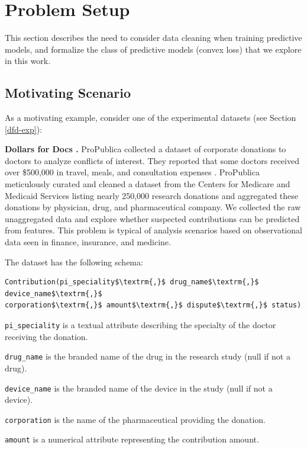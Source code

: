 \section{Problem Setup}\label{background}
This section describes the need to consider data cleaning when training predictive models, and formalize the class of predictive models (convex loss) that we explore in this work.

\subsection{Motivating Scenario}
As a motivating example, consider one of the experimental datasets (see Section \ref{dfd-exp}):

\vspace{0.25em}

\noindent\textbf{Dollars for Docs \cite{dollarsfordocs}. }
ProPublica collected a dataset of corporate donations to doctors to analyze conflicts of interest. 
They reported that some doctors received over \$500,000 in travel, meals, and consultation expenses \cite{dollarsfordocsa}.
ProPublica meticulously curated and cleaned a dataset from the Centers for Medicare and Medicaid Services listing nearly 250,000 research donations and aggregated these donations by physician, drug, and pharmaceutical company.
We collected the raw unaggregated data and explore whether suspected contributions can be predicted from features.
This problem is typical of analysis scenarios based on observational data seen in finance, insurance, and medicine.

The dataset has the following schema:
\begin{lstlisting}[mathescape,basicstyle={\scriptsize}]
Contribution(pi_speciality$\textrm{,}$ drug_name$\textrm{,}$ device_name$\textrm{,}$
corporation$\textrm{,}$ amount$\textrm{,}$ dispute$\textrm{,}$ status)
\end{lstlisting}

\noindent\texttt{pi\_speciality} is a textual attribute describing the specialty of the doctor receiving the donation.

\noindent\texttt{drug\_name} is the branded name of the drug in the research study (null if not a drug).

\noindent\texttt{device\_name} is the branded name of the device in the study (null if not a device).

\noindent\texttt{corporation} is the name of the pharmaceutical providing the donation.

\noindent\texttt{amount} is a numerical attribute representing the contribution amount.

